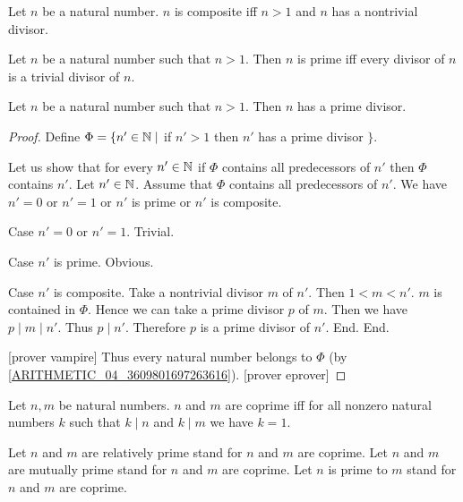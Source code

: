 \documentclass[10pt]{article}
\begin{document}
  \begin{forthel}
    \begin{definition}
      Let $n$ be a natural number.
      $n$ is composite iff $n > 1$ and $n$ has a nontrivial divisor.
    \end{definition}
  \end{forthel}

  \begin{forthel}
    \begin{proposition}
      Let $n$ be a natural number such that $n > 1$.
      Then $n$ is prime iff every divisor of $n$ is a trivial divisor of $n$.
    \end{proposition}
  \end{forthel}

  \begin{forthel}
    \begin{proposition}
      Let $n$ be a natural number such that $n > 1$.
      Then $n$ has a prime divisor.
    \end{proposition}
    \begin{proof}
      Define $\Phi = \{ n' \in \mathbb{N} \mid$ if $n' > 1$ then $n'$ has a prime divisor $\}$.

      Let us show that for every $n' \in \mathbb{N}$ if $\Phi$ contains all
      predecessors of $n'$ then $\Phi$ contains $n'$.
        Let $n' \in \mathbb{N}$.
        Assume that $\Phi$ contains all predecessors of $n'$.
        We have $n' = 0$ or $n' = 1$ or $n'$ is prime or $n'$ is composite.

        Case $n' = 0$ or $n' = 1$. Trivial.

        Case $n'$ is prime. Obvious.

        Case $n'$ is composite.
          Take a nontrivial divisor $m$ of $n'$.
          Then $1 < m < n'$.
          $m$ is contained in $\Phi$.
          Hence we can take a prime divisor $p$ of $m$.
          Then we have $p \mid m \mid n'$.
          Thus $p \mid n'$.
          Therefore $p$ is a prime divisor of $n'$.
        End.
      End.

      [prover vampire]
      Thus every natural number belongs to $\Phi$ (by \cref{ARITHMETIC_04_3609801697263616}).
      [prover eprover]
    \end{proof}
  \end{forthel}

  \begin{forthel}
    \begin{definition}
      Let $n, m$ be natural numbers.
      $n$ and $m$ are coprime iff for all nonzero natural numbers $k$ such that
      $k \mid n$ and $k \mid m$ we have $k = 1$.
    \end{definition}

    Let $n$ and $m$ are relatively prime stand for $n$ and $m$ are coprime.
    Let $n$ and $m$ are mutually prime stand for $n$ and $m$ are coprime.
    Let $n$ is prime to $m$ stand for $n$ and $m$ are coprime.
  \end{forthel}
\end{document}
